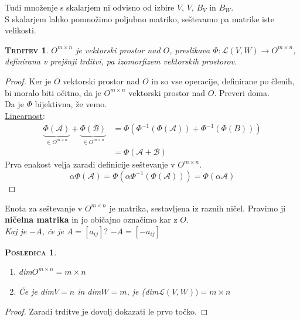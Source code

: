 \documentclass[a4paper,12pt]{article}
\newtheorem*{trditev}{\textsc{Trditev}}
\newtheorem*{posledica}{\textsc{Posledica}}
\begin{document}
Tudi množenje s skalarjem ni odvisno od izbire $V$, $V$, $B_V$ in $B_W$. \\

S skalarjem lahko pomnožimo poljubno matriko, seštevamo pa matrike iste velikosti. \\

\begin{trditev}
	$O^{m\times n}$ je vektorski prostor nad $O$, preslikava $\Phi: \mathcal{L}(V,W)\to O^{m\times n}$, definirana v prejšnji trditvi, pa izomorfizem vektorskih prostorov.\\
\end{trditev}

\begin{proof}
	Ker je $O$ vektorski prostor nad $O$ in so vse operacije, definirane po členih, bi moralo biti očitno, da je $O^{m\times n}$ vektorski prostor nad $O$. Preveri doma.\\
	
	Da je $\Phi$ bijektivna, že vemo. \\

	\underline{Linearnost}: 
	\begin{align*}
		\underbrace{\Phi(\mathcal{A})}_{\in O^{m\times n}}+\underbrace{\Phi(\mathcal{B})}_{\in O^{m\times n}}&=\Phi(\Phi^{-1}(\Phi(\mathcal{A}))+\Phi^{-1}(\Phi(B)))\\
		&=\Phi(\mathcal{A}+\mathcal{B})
	\end{align*}
	Prva enakost velja zaradi definicije seštevanje v $O^{m\times n}$. \\

	\begin{equation*}
		\alpha \Phi(\mathcal{A}) = \Phi(\alpha \Phi^{-1}(\Phi(\mathcal{A})))=\Phi(\alpha \mathcal{A})
	\end{equation*}
\end{proof}

Enota za seštevanje v $O^{m\times n}$ je matrika, sestavljena iz raznih ničel. Pravimo ji \textbf{ničelna matrika} in jo običajno označimo kar z $O$.\\

\textit{Kaj je $-A$, če je $A=[a_{ij}]?$} $-A=[-a_{ij}]$ \\

\begin{posledica} ~\\
	\begin{enumerate}
		\item dim$O^{m\times n}=m\times n$
		\item Če je dim$V=n$ in dim$W=m$, je (dim$\mathcal{L}(V,W))=m\times n$ \\
	\end{enumerate}
\end{posledica}

\begin{proof}
	Zaradi trditve je dovolj dokazati le prvo točko. 
\end{proof}
\end{document}
